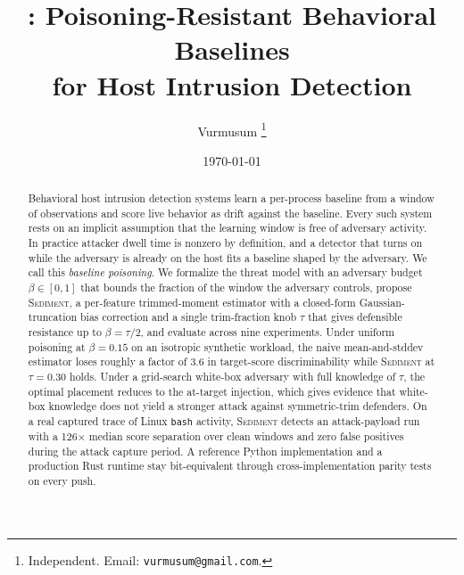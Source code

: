 \documentclass[10pt,letterpaper]{article}
\title{\sediment{}: Poisoning-Resistant Behavioral Baselines\\for Host Intrusion Detection}
\author{Vurmusum%
  \thanks{Independent. Email: \texttt{vurmusum@gmail.com}.}}
\date{\today}
\newcommand{\sediment}{\textsc{Sediment}}
\newcommand{\trim}{\ensuremath{\tau}} %
\newcommand{\budget}{\ensuremath{\beta}} %
\begin{document}
\maketitle

\begin{abstract}
Behavioral host intrusion detection systems learn a per-process
baseline from a window of observations and score live behavior as
drift against the baseline. Every such system rests on an implicit
assumption that the learning window is free of adversary activity.
In practice attacker dwell time is nonzero by definition, and a
detector that turns on while the adversary is already on the host
fits a baseline shaped by the adversary. We call this \emph{baseline
poisoning}. We formalize the threat model with an adversary budget
$\budget \in [0, 1]$ that bounds the fraction of the window the
adversary controls, propose \sediment{}, a per-feature trimmed-moment
estimator with a closed-form Gaussian-truncation bias correction and
a single trim-fraction knob \trim{} that gives defensible resistance
up to $\budget = \trim{}/2$, and evaluate across nine experiments.
Under uniform poisoning at $\budget = 0.15$ on an isotropic synthetic
workload, the naive mean-and-stddev estimator loses roughly a factor
of 3.6 in target-score discriminability while \sediment{} at
$\trim{} = 0.30$ holds. Under a grid-search white-box adversary with
full knowledge of \trim{}, the optimal placement reduces to the
at-target injection, which gives evidence that white-box knowledge
does not yield a stronger attack against symmetric-trim defenders.
On a real captured trace of Linux \texttt{bash} activity, \sediment{}
detects an attack-payload run with a 126$\times$ median score
separation over clean windows and zero false positives during the
attack capture period. A reference Python implementation and a
production Rust runtime stay bit-equivalent through
cross-implementation parity tests on every push.
\end{abstract}











\printbibliography
\end{document}
